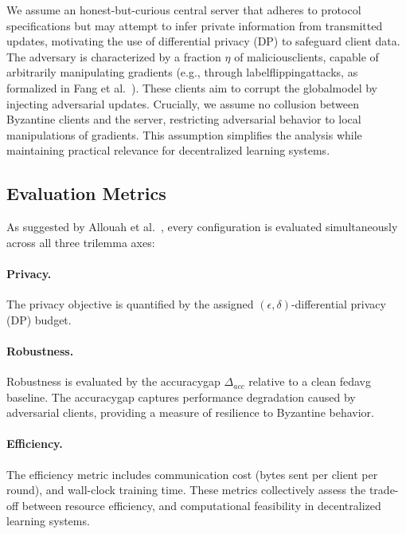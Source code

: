\documentclass[11pt,twocolumn,a4paper,DIV=calc,parskip=half]{scrartcl}
\begin{document}
	We assume an honest-but-curious central server that adheres to protocol specifications but may attempt to infer private information from transmitted updates, motivating the use of differential privacy (DP) to safeguard client data. The adversary is characterized by a fraction $\eta$ of \glspl{maliciousclient}, capable of arbitrarily manipulating gradients (e.g., through \glspl{labelflippingattack}, as formalized in Fang et al.~\cite{fang2020poisoning}). These clients aim to corrupt the \gls{globalmodel} by injecting adversarial updates. Crucially, we assume no collusion between Byzantine clients and the server, restricting adversarial behavior to local manipulations of gradients. This assumption simplifies the analysis while maintaining practical relevance for decentralized learning systems.
	
	\subsection{Evaluation Metrics}
	\label{sec:metrics}
	
	As suggested by Allouah et al.~\cite{allouah2023balancing}, every configuration is evaluated simultaneously across all three trilemma axes:
	
	\paragraph{Privacy.}
	
	The privacy objective is quantified by the assigned $(\epsilon,\delta)$-differential privacy (DP) budget.
	
	\paragraph{Robustness.}
	
	Robustness is evaluated by the \gls{accuracygap} $\Delta_{acc}$ relative to a clean \gls{fedavg} baseline. The \gls{accuracygap} captures performance degradation caused by adversarial clients, providing a measure of resilience to Byzantine behavior.
	
	\paragraph{Efficiency.}

	The efficiency metric includes communication cost (bytes sent per client per round), and wall-clock training time. These metrics collectively assess the trade-off between resource efficiency, and computational feasibility in decentralized learning systems.
	
\end{document}
